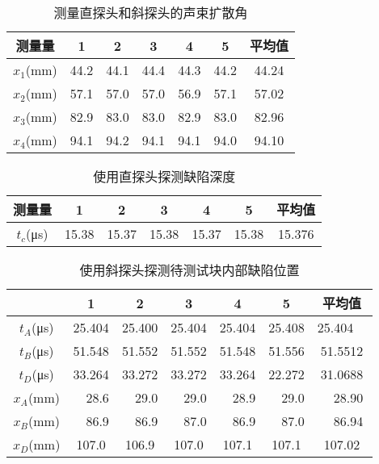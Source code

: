 \documentclass[a4paper,utf8]{article}
\begin{document}
\begin{table}[!ht]
    \caption{测量直探头和斜探头的声束扩散角}\label{tab:exp6}
    \begin{tabularx}{\textwidth}{*{7}{C}} \toprule
        测量量 & 1 & 2 & 3 & 4 & 5 & 平均值 \\ \midrule
        $x_1$(\unit{\mm}) & 44.2 & 44.1 & 44.4 & 44.3 & 44.2 & 44.24 \\ 
        $x_2$(\unit{\mm}) & 57.1 & 57.0 & 57.0 & 56.9 & 57.1 & 57.02 \\ 
        $x_3$(\unit{\mm}) & 82.9 & 83.0 & 83.0 & 82.9 & 83.0 & 82.96 \\ 
        $x_4$(\unit{\mm}) & 94.1 & 94.2 & 94.1 & 94.1 & 94.0 & 94.10 \\ \bottomrule
    \end{tabularx}
\end{table}

\begin{table}[!ht]
    \caption{使用直探头探测缺陷深度}\label{tab:exp7}
    \begin{tabularx}{\textwidth}{*{7}{C}} \toprule
        测量量 & 1 & 2 & 3 & 4 & 5 & 平均值 \\ \midrule
        $t_c$(\unit{\us}) & 15.38 & 15.37 & 15.38 & 15.37 & 15.38 & 15.376 \\ \bottomrule
    \end{tabularx}
\end{table}

\begin{table}[!ht]
    \caption{使用斜探头探测待测试块内部缺陷位置}\label{tab:exp8}
    \begin{tabularx}{\textwidth}{*{7}{C}} \toprule
        ~ & 1 & 2 & 3 & 4 & 5 & 平均值 \\ \midrule
        $t_A$(\unit{\us}) & 25.404 & 25.400 & 25.404 & 25.404 & 25.408 & 25.404~~{} \\
        $t_B$(\unit{\us}) & 51.548 & 51.552 & 51.552 & 51.548 & 51.556 & 51.5512 \\
        $t_D$(\unit{\us}) & 33.264 & 33.272 & 33.272 & 33.264 & 22.272 & 31.0688 \\[2mm]
        $x_A$(\unit{\mm}) & ~~28.6 & ~~29.0 & ~~29.0 & ~~28.9 & ~~29.0 & ~~28.90 \\
        $x_B$(\unit{\mm}) & ~~86.9 & ~~86.9 & ~~87.0 & ~~86.9 & ~~87.0 & ~~86.94 \\
        $x_D$(\unit{\mm}) & 107.0 & 106.9 & 107.0 & 107.1 & 107.1 & 107.02 \\
        \bottomrule
    \end{tabularx}
\end{table}

\end{document}
